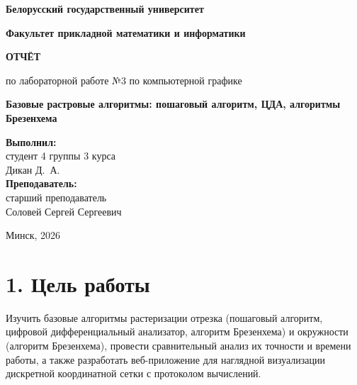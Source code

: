 \documentclass[11pt,a4paper]{article}
\begin{document}
\begin{titlepage}
    \centering
    {\bfseries\large Белорусский государственный университет\par}
    {\bfseries\large Факультет прикладной математики и информатики\par}
    
    \vspace{6cm}
    {\Huge\bfseries ОТЧЁТ\par}
    \vspace{0.5cm}
    {\large по лабораторной работе №3 по компьютерной графике\par}
    \vspace{0.5cm}
    {\Large\bfseries Базовые растровые алгоритмы: пошаговый алгоритм, ЦДА, алгоритмы Брезенхема\par}
    
    \vspace{6cm}
    \begin{flushright}
        \large
        \textbf{Выполнил:}\\
        студент 4 группы 3 курса\\
        Дикан Д.~А.\\[1em]
        \textbf{Преподаватель:}\\
        старший преподаватель\\
        Соловей Сергей Сергеевич
    \end{flushright}
    
    \vfill
    {\large Минск, 2026\par}
\end{titlepage}

\newpage

\section*{1. Цель работы}
Изучить базовые алгоритмы растеризации отрезка (пошаговый алгоритм, цифровой дифференциальный анализатор, алгоритм Брезенхема) и окружности (алгоритм Брезенхема), провести сравнительный анализ их точности и времени работы, а также разработать веб-приложение для наглядной визуализации дискретной координатной сетки с протоколом вычислений.
\end{document}
